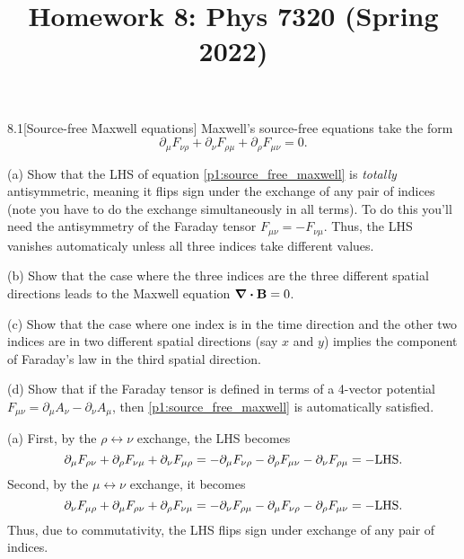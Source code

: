 \documentclass[12pt]{article}
\title{Homework 8: Phys 7320 (Spring 2022)}
\begin{document}
\maketitle
\begin{problem}{8.1}[Source-free Maxwell equations]
Maxwell's source-free equations take the form
\begin{equation}\label{p1:source_free_maxwell}
    \partial_\mu F_{\nu\rho}+\partial_\nu F_{\rho\mu}
    +\partial_\rho F_{\mu\nu}=0.
\end{equation}

(a) Show that the LHS of equation \eqref{p1:source_free_maxwell} is
\textit{totally} antisymmetric, meaning it flips sign under the exchange of any
pair of indices (note you have to do the exchange simultaneously in all terms).
To do this you'll need the antisymmetry of the Faraday tensor
$F_{\mu\nu}=-F_{\nu\mu}$. Thus, the LHS vanishes automaticaly unless all three
indices take different values.

(b) Show that the case where the three indices are the three different spatial
directions leads to the Maxwell equation $\div{\vb{B}}=0$.

(c) Show that the case where one index is in the time direction and the other
two indices are in two different spatial directions (say $x$ and $y$) implies
the component of Faraday's law in the third spatial direction.

(d) Show that if the Faraday tensor is defined in terms of a 4-vector potential
$F_{\mu\nu}=\partial_\mu A_\nu-\partial_\nu A_\mu$, then
\eqref{p1:source_free_maxwell} is automatically satisfied.
\begin{solution}
(a) First, by the $\rho\longleftrightarrow\nu$ exchange, the LHS becomes
\begin{equation}
    \partial_\mu F_{\rho\nu}
    +\partial_\rho F_{\nu\mu}
    +\partial_\nu F_{\mu\rho}
    =-\partial_\mu F_{\nu\rho}
    -\partial_\rho F_{\mu\nu}
    -\partial_\nu F_{\rho\mu}
    =-\text{LHS}.
\end{equation}
Second, by the $\mu\longleftrightarrow\nu$ exchange, it becomes
\begin{equation}
    \partial_\nu F_{\mu\rho}
    +\partial_\mu F_{\rho\nu}
    +\partial_\rho F_{\nu\mu}
    =-\partial_\nu F_{\rho\mu}
    -\partial_\mu F_{\nu\rho}
    -\partial_\rho F_{\mu\nu}
    =-\text{LHS}.
\end{equation}
Thus, due to commutativity, the LHS flips sign under exchange of any pair of
indices.


\end{solution}
\end{problem}
\end{document}
